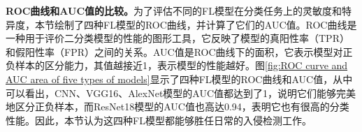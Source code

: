 \textbf{ROC曲线和AUC值的比较。}\label{subsection:ROC_curve_and_AUC_value_comparison}为了评估不同的FL模型在分类任务上的灵敏度和特异度，本节绘制了四种FL模型的ROC曲线，并计算了它们的AUC值。ROC曲线是一种用于评价二分类模型的性能的图形工具，它反映了模型的真阳性率（TPR）和假阳性率（FPR）之间的关系。AUC值是ROC曲线下的面积，它表示模型对正负样本的区分能力，其值越接近1，表示模型的性能越好。图\ref{fig:ROC curve and AUC area of five types of models}显示了四种FL模型的ROC曲线和AUC值，从中可以看出，CNN、VGG16、AlexNet模型的AUC值都达到了1，说明它们能够完美地区分正负样本，而ResNet18模型的AUC值也高达0.94，表明它也有很高的分类性能。因此，本节认为这四种FL模型都能够胜任日常的入侵检测工作。

\begin{figure}[htb]
\centering    
\end{figure}
